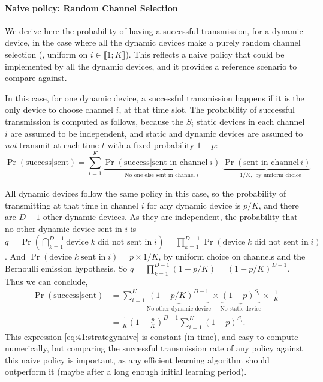 \paragraph{Naive policy: Random Channel Selection}

We derive here the probability of having a successful transmission, for a dynamic device, in the case where all the dynamic devices make a purely random channel selection (\ie, uniform on $i \in \llbracket 1; K \rrbracket$).
This reflects a naive policy that could be implemented by all the dynamic devices, and it provides a reference scenario to compare against.

In this case, for one dynamic device, a successful transmission happens if it is the only device to choose channel $i$, at that time slot.
The probability of successful transmission is computed as follows, because the $S_i$ static devices in each channel $i$ are assumed to be independent, and static and dynamic devices are assumed to \emph{not} transmit at each time $t$ with a fixed probability $1-p$:
\begin{equation}
    \Pr(\text{success}|\text{sent}) = \sum_{i=1}^{K} \underbrace{\Pr(\text{success}|\text{sent in channel}\;i)}_{\text{No one else sent in channel}\; i} \; \underbrace{\Pr(\text{sent in channel}\,i)}_{= 1/K, \text{ by uniform choice}}
\end{equation}

All dynamic devices follow the same policy in this case, so the probability of transmitting at that time in channel $i$ for any dynamic device is $p / K$, and there are $D-1$ other dynamic devices.
As they are independent, the probability that no other dynamic device sent in $i$
is $q = \Pr(\bigcap_{k=1}^{D-1} \text{device}\;k\;\text{did not sent in}\;i) = \prod_{k=1}^{D-1} \Pr(\text{device}\;k\;\text{did not sent in}\;i)$. And $\Pr(\text{device}\;k\;\text{sent in}\;i) = p \times 1 / K$, by uniform choice on channels and the Bernoulli emission hypothesis. So $q = \prod_{k=1}^{D-1} (1 - p/K) = (1-p/K)^{D-1}$. Thus we can conclude,
%
\begin{align}\label{eq:41:strategynaive}
    \Pr(\text{success}|\text{sent})
    & = \sum_{i=1}^{K} \underbrace{(1 - p / K)^{D-1}}_{\text{No other dynamic device}} \times \underbrace{(1-p)^{S_i}}_{\text{No static device}} \times\; \frac{1}{K} \nonumber \\
    & = \frac{1}{K} \left(1-\frac{p}{K}\right)^{D-1} \sum_{i=1}^{K} (1-p)^{S_i} .
\end{align}
This expression \eqref{eq:41:strategynaive} is constant (in time), and easy to compute numerically, but comparing the successful transmission rate of any policy against this naive policy is important, as any efficient learning algorithm should outperform it
(maybe after a long enough initial learning period).


